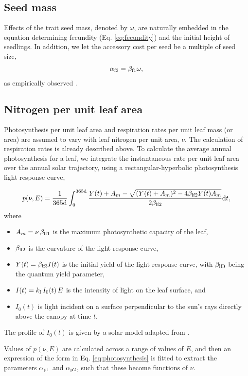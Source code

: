 \documentclass[10pt,twoside]{article}
\begin{document}
\subsection{Seed mass}

Effects of the trait seed mass, denoted by $\omega$, are naturally embedded in the equation determining
fecundity (Eq. \ref{eq:fecundity}) and the initial height of seedlings. In addition,
we let the accessory cost per seed be a multiple of seed size,
$$\alpha_{{\rm f3}} = \beta_{{\rm f1}} \omega,$$
as empirically observed \citep{Henery-2001}.

\subsection{Nitrogen per unit leaf area}

Photosynthesis per unit leaf area and respiration rates per unit leaf mass (or area)
are assumed to vary with leaf nitrogen per unit area, $\nu$. The calculation of respiration rates is already described above. To calculate the average annual photosynthesis for a leaf,
we integrate the instantaneous rate per unit leaf area over the annual solar trajectory,
using a rectangular-hyperbolic photosynthesis light response curve,

$$p(\nu, E) = \frac1{365 \textrm{d}}\int_0^{365 \textrm{d}}\frac{Y(t) + A_m - \sqrt{(Y(t) + A_m)^2 - 4 \beta_{{\rm lf2}} Y(t) A_m }}{2 \beta_{{\rm lf2}}} {\rm d}t,$$
where
\begin{itemize}
\item $A_m = \nu \, \beta_{{\rm lf1}}$ is the maximum photosynthetic capacity of the leaf,
\item $\beta_{{\rm lf2}}$ is the curvature of the light response curve,
\item $Y(t) = \beta_{{\rm lf3}} I(t)$ is the initial yield of the light response curve, with $\beta_{{\rm lf3}}$ being the quantum yield parameter,
\item $I(t) = k_{\rm I} \, I_0(t)\, E$ is the intensity of light on the leaf surface, and
\item $I_0(t)$ is light incident on a surface perpendicular to the sun's rays directly above the canopy at time $t$.
\end{itemize}
The profile of $I_0(t)$ is given by a solar model adapted from \citet{TerSteege-1997}.

Values of $p(\nu, E)$ are calculated across a range of values of $E$, and then an expression of the form in Eq. \ref{eq:photosynthesis} is fitted to extract the parameters
$\alpha_{{\rm p1}}$ and $\alpha_{{\rm p2}}$, such that these become functions of $\nu$.
\end{document}
